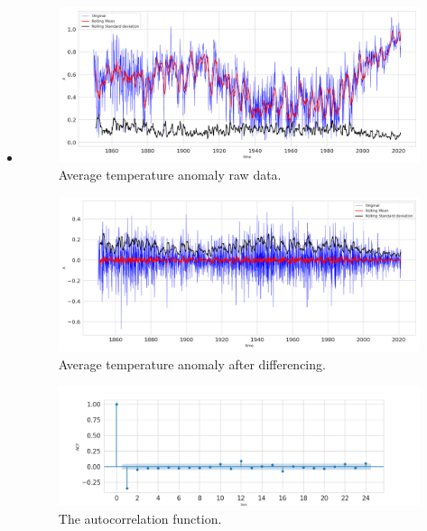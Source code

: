 \documentclass[]{article}
\begin{document}
	\subsection{}
	\begin{itemize}
		\item 
		\begin{figure}
			\centering
			\includegraphics[width=1\textwidth]{images/ts_moving_avg_B.png}
			\caption{Average temperature anomaly raw data.}
			\label{fig:rollingmean_B}
		\end{figure}
		\begin{figure}
			\centering
			\includegraphics[width=1\textwidth]{images/ts_moving_avg_diff_B.png}
			\caption{Average temperature anomaly after differencing.}
			\label{fig:rollingmean_diff_B}
		\end{figure}
		\begin{figure}
			\centering
			\includegraphics[width=1\textwidth]{images/autocorrelation_B.png}
			\caption{The autocorrelation function.}

\end{figure}
\end{itemize}
\end{document}
